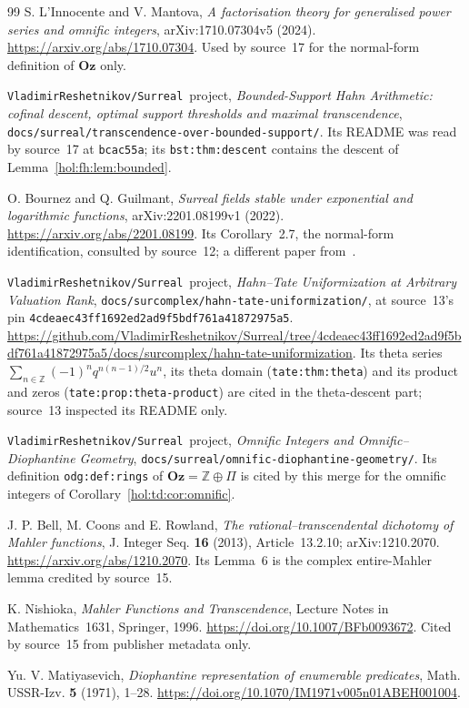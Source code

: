 \documentclass[11pt]{article}
\numberwithin{equation}{section}
\theoremstyle{definition}
\theoremstyle{remark}
\newcommand{\Z}{\mathbb Z}
\newcommand{\repo}{\texttt{VladimirReshetnikov/Surreal}}
\newcommand{\Oz}{\mathbf{Oz}}
\begin{document}
\begin{thebibliography}{99}
S. L'Innocente and V. Mantova,
\emph{A factorisation theory for generalised power series and omnific
integers}, arXiv:1710.07304v5 (2024).
\url{https://arxiv.org/abs/1710.07304}.
Used by source~17 for the normal-form definition of $\Oz$ only.

\repo\ project,
\emph{Bounded-Support Hahn Arithmetic: cofinal descent, optimal support
thresholds and maximal transcendence},
\texttt{docs/surreal/transcendence-over-bounded-support/}. Its README was read
by source~17 at \texttt{bcac55a}; its \texttt{bst:thm:descent} contains the
descent of Lemma~\ref{hol:fh:lem:bounded}.

O. Bournez and Q. Guilmant,
\emph{Surreal fields stable under exponential and logarithmic functions},
arXiv:2201.08199v1 (2022).
\url{https://arxiv.org/abs/2201.08199}.
Its Corollary~2.7, the normal-form identification, consulted by source~12;
a different paper from~\cite{bg}.

\repo\ project,
\emph{Hahn--Tate Uniformization at Arbitrary Valuation Rank},
\texttt{docs/surcomplex/hahn-tate-uniformization/}, at source~13's pin
\texttt{4cdeaec43ff1692ed2ad9f5bdf761a41872975a5}.
\url{https://github.com/VladimirReshetnikov/Surreal/tree/4cdeaec43ff1692ed2ad9f5bdf761a41872975a5/docs/surcomplex/hahn-tate-uniformization}.
Its theta series $\sum_{n\in\Z}(-1)^nq^{n(n-1)/2}u^n$, its theta domain
(\texttt{tate:thm:theta}) and its product and zeros
(\texttt{tate:prop:theta-product}) are cited in the theta-descent part;
source~13 inspected its README only.

\repo\ project,
\emph{Omnific Integers and Omnific--Diophantine Geometry},
\texttt{docs/surreal/omnific-diophantine-geometry/}. Its definition
\texttt{odg:def:rings} of $\Oz=\Z\oplus\Pi$ is cited by this merge for the
omnific integers of Corollary~\ref{hol:td:cor:omnific}.

J. P. Bell, M. Coons and E. Rowland,
\emph{The rational--transcendental dichotomy of Mahler functions},
J. Integer Seq. \textbf{16} (2013), Article~13.2.10; arXiv:1210.2070.
\url{https://arxiv.org/abs/1210.2070}.
Its Lemma~6 is the complex entire-Mahler lemma credited by source~15.

K. Nishioka, \emph{Mahler Functions and Transcendence}, Lecture Notes in
Mathematics~1631, Springer, 1996. \url{https://doi.org/10.1007/BFb0093672}.
Cited by source~15 from publisher metadata only.

Yu. V. Matiyasevich, \emph{Diophantine representation of enumerable
predicates}, Math. USSR-Izv. \textbf{5} (1971), 1--28.
\url{https://doi.org/10.1070/IM1971v005n01ABEH001004}.


\end{thebibliography}
\end{document}
